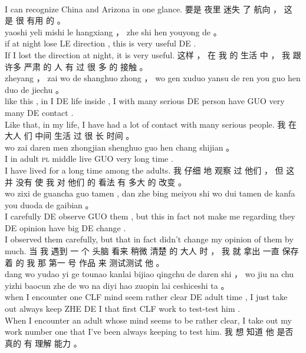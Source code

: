 \documentclass[UTF8]{ctexart}
\begin{document}
\begin{exe}
\\
\trans I can recognize China and Arizona in one glance.
\ex
\glll
要是 夜里 迷失 了 航向 ， 这 是 很 有用 的 。
\\
yaoshi yeli mishi le hangxiang ， zhe shi hen youyong de 。
\\
if {at night} lose LE direction , this is very useful DE .
\\
\trans If I lost the direction at night, it is very useful. 
\ex
\glll
这样 ， 在 我 的 生活 中 ， 我 跟 许多 严肃 的 人 有 过 很 多 的 接触 。
\\
zheyang  ， zai wo de shanghuo zhong ， wo gen xuduo yansu de ren you guo hen duo de jiechu 。
\\
{like this} , in I DE life inside , I with many serious DE person have GUO very many DE contact .
\\
\trans Like that, in my life, I have had a lot of contact with many serious people. 
\ex
\glll
我 在 大人 们 中间 生活 过 很 长 时间 。
\\
wo zai daren men zhongjian shenghuo guo hen chang shijian 。
\\
I in adult \textsc{pl} middle live GUO very long time .
\\
\trans I have lived for a long time among the adults. 
\ex
\glll
我 仔细 地 观察 过 他们 ， 但 这 并 没有 使 我 对 他们 的 看法 有 多大 的 改变 。
\\
wo zixi de guancha guo tamen , dan zhe bing meiyou shi wo dui tamen de kanfa you duoda de gaibian 。
\\
I carefully DE observe GUO them , but this {in fact} not make me regarding they DE opinion have big DE change .
\\
\trans I observed them carefully, but that in fact didn't change my opinion of them by much. 
\ex
\glll
当 我 遇到 一 个 头脑 看来 稍微 清楚 的 大人 时 ， 我 就 拿出 一直 保存 着 的 我 那 第一 号 作品 来 测试测试 他 。
\\
dang wo yudao yi ge tounao kanlai bijiao qingchu de daren shi ， wo jiu  na chu yizhi baocun zhe de wo na  diyi  hao zuopin lai ceshiceshi ta 。
\\
when I encounter one CLF mind seem rather  clear  DE adult time , I just {take out} always keep   ZHE DE I  that first CLF  work  to   test-test him .
\\
\trans When I encounter an adult whose mind seems to be rather clear, I take out my work number one that I've been always keeping to test him.
\ex
\glll
我 想 知道 他 是否 真的 有 理解 能力 。
\\

\end{exe}
\end{document}
